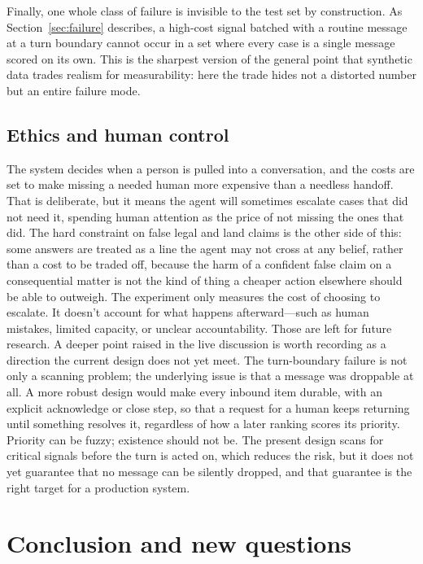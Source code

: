 \documentclass{article}
\begin{document}
Finally, one whole class of failure is invisible to the test set by construction.
As Section~\ref{sec:failure} describes, a high-cost signal batched with a routine
message at a turn boundary cannot occur in a set where every case is a single
message scored on its own. This is the sharpest version of the general point that
synthetic data trades realism for measurability: here the trade hides not a
distorted number but an entire failure mode.

\subsection{Ethics and human control}
The system decides when a person is pulled into a conversation, and the costs are
set to make missing a needed human more expensive than a needless handoff. That is
deliberate, but it means the agent will sometimes escalate cases that did not need
it, spending human attention as the price of not missing the ones that did. The
hard constraint on false legal and land claims is the other side of this: some
answers are treated as a line the agent may not cross at any belief, rather than a
cost to be traded off, because the harm of a confident false claim on a
consequential matter is not the kind of thing a cheaper action elsewhere should be
able to outweigh.
The experiment only measures the cost of choosing to escalate. It doesn’t account for what happens afterward—such as human mistakes, limited capacity, or unclear accountability. Those are left for future research.
A deeper point raised in the live discussion is worth recording as a direction the
current design does not yet meet. The turn-boundary failure is not only a scanning
problem; the underlying issue is that a message was droppable at all. A more robust
design would make every inbound item durable, with an explicit acknowledge or
close step, so that a request for a human keeps returning until something resolves
it, regardless of how a later ranking scores its priority. Priority can be fuzzy;
existence should not be. The present design scans for critical signals before the
turn is acted on, which reduces the risk, but it does not yet guarantee that no
message can be silently dropped, and that guarantee is the right target for a
production system.

\section{Conclusion and new questions}
\label{sec:conclusion}
\end{document}
